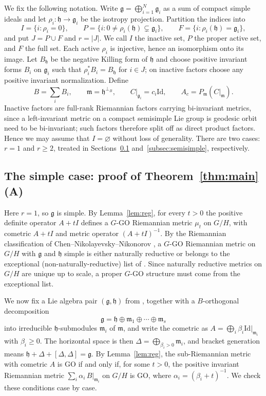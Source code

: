 \documentclass[12pt]{amsart}
\theoremstyle{plain}
\theoremstyle{definition}
\theoremstyle{remark}
\newcommand{\alg}[1]{\mathfrak{#1}}
\newcommand{\Idm}{\mathrm{Id}}
\begin{document}
We fix the following notation. Write $\alg{g}=\bigoplus_{i=1}^{N}\alg{g}_i$ as a sum of compact
simple ideals and let $\rho_i:\alg{h}\to\alg{g}_i$ be the isotropy projection. Partition the
indices into
\[ I=\{i:\rho_i=0\},\qquad P=\{i:0\neq\rho_i(\alg{h})\subsetneq\alg{g}_i\},\qquad
F=\{i:\rho_i(\alg{h})=\alg{g}_i\}, \]
and put $J=P\cup F$ and $r=|J|$. We call $I$ the inactive set, $P$ the proper active set, and $F$
the full set. Each active $\rho_i$ is injective, hence an isomorphism onto its image. Let
$B_{\alg{h}}$ be the negative Killing form of $\alg{h}$ and choose positive invariant forms $B_i$
on $\alg{g}_i$ such that $\rho_i^{*}B_i=B_{\alg{h}}$ for $i\in J$; on inactive factors choose any
positive invariant normalization. Define
\begin{equation}\label{eq:compression}
B=\sum_i B_i,\qquad \alg{m}=\alg{h}^{\perp_B},\qquad C|_{\alg{g}_i}=c_i\Idm,\qquad
A_c=P_{\alg{m}}(C|_{\alg{m}}).
\end{equation}
Inactive factors are full-rank Riemannian factors carrying bi-invariant metrics, since a
left-invariant metric on a compact semisimple Lie group is geodesic orbit need to be bi-invariant; such factors therefore
split off as direct product factors. Hence we may assume that $I=\varnothing$ without loss of
generality. There are two cases: $r=1$ and $r\ge2$, treated in Sections~\ref{subsec:simple}
and~\ref{subsec:semisimple}, respectively.

\subsection{The simple case: proof of Theorem~\ref{thm:main}(A)}\label{subsec:simple}

Here $r=1$, so $\alg{g}$ is simple. By Lemma~\ref{lem:reg}, for every $t>0$ the positive definite
operator $A+tI$ defines a $G$-GO Riemannian metric $\mu_t$ on $G/H$, with cometric $A+tI$ and
metric operator $(A+tI)^{-1}$. By the Riemannian classification of
Chen--Nikolayevsky--Nikonorov \cite[Thms.~1--2]{ChenNN}, a $G$-GO Riemannian metric on $G/H$ with
$\alg{g}$ and $\alg{h}$ simple is either naturally reductive or belongs to the exceptional
(non-naturally-reductive) list of \cite[Table~1]{ChenNN}. Since naturally reductive metrics on
$G/H$ are unique up to scale, a proper $G$-GO structure must come from the exceptional list.

We now fix a Lie algebra pair $(\alg{g},\alg{h})$ from \cite[Table~1]{ChenNN}, together with a
$B$-orthogonal decomposition
\[ \alg{g}=\alg{h}\oplus\alg{m}_1\oplus\cdots\oplus\alg{m}_s \]
into irreducible $\alg{h}$-submodules $\alg{m}_i$ of $\alg{m}$, and write the cometric as
$A=\bigoplus_i\beta_i\Idm|_{\alg{m}_i}$ with $\beta_i\ge0$. The horizontal space is then
$\Delta=\bigoplus_{\beta_i>0}\alg{m}_i$, and bracket generation means
$\alg{h}+\Delta+[\Delta,\Delta]=\alg{g}$. By Lemma~\ref{lem:reg}, the sub-Riemannian metric with
cometric $A$ is GO if and only if, for some $t>0$, the positive invariant Riemannian metric
$\sum_i\alpha_i\,B|_{\alg{m}_i}$ on $G/H$ is GO, where $\alpha_i=(\beta_i+t)^{-1}$. We check these
conditions case by case.
\end{document}
